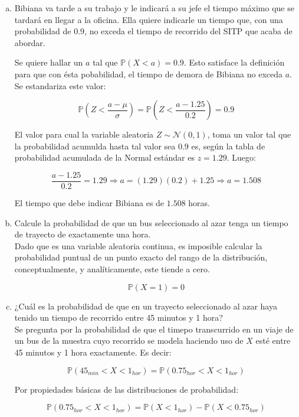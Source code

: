 \documentclass[11pt, spanish]{article}
\begin{document}
\begin{enumerate}[(a)]
\item Bibiana va tarde a su trabajo y le indicará a su jefe el tiempo máximo que se
tardará en llegar a la oficina. Ella quiere indicarle un tiempo que, con una probabilidad de 0.9,
no exceda el tiempo de recorrido del SITP que acaba de abordar.

Se quiere hallar un $a$ tal que $\mathbb{P}(X < a) = 0.9$. Esto satisface la definición para que con ésta pobabilidad, el tiempo de demora de Bibiana no exceda $a$. Se estandariza este valor:

$$\mathbb{P}\left(Z < \frac{a - \mu}{\sigma} \right) = \mathbb{P}\left(Z < \frac{a - 1.25}{0.2} \right)  = 0.9$$

El valor para cual la variable aleatoria $Z \sim \mathcal{N} (0, 1)$, toma un valor tal que la probabilidad acumulda hasta tal valor sea $0.9$ es, según la tabla de probabilidad acumulada de la Normal estándar es $z = 1.29$. Luego:

$$\frac{a - 1.25}{0.2} = 1.29 \Rightarrow a = (1.29)(0.2) + 1.25 \Rightarrow a = 1.508$$

El tiempo que debe indicar Bibiana es de $1.508$ horas.

\pagebreak
\item Calcule la probabilidad de que un bus seleccionado al azar tenga un tiempo de
trayecto de exactamente una hora.\\

Dado que es una variable aleatoria continua, es imposible calcular la probabilidad puntual de un punto exacto del rango de la distribución, conceptualmente, y analíticamente, este tiende a cero.

$$\mathbb{P}\left(X = 1\right) = 0$$

\item ¿Cuál es la probabilidad de que en un trayecto seleccionado al azar haya tenido
un tiempo de recorrido entre 45 minutos y 1 hora?\\

Se pregunta por la probabilidad de que el timepo transcurrido en un viaje de un bus de la muestra cuyo recorrido se modela haciendo uso de $X$ esté entre 45 minutos y 1 hora exactamente. Es decir:

$$\mathbb{P}(45_{min} < X < 1_{hor}) = \mathbb{P}(0.75_{hor} < X < 1_{hor})$$
 
Por propiedades básicas de las distribuciones de probabilidad:
 
$$\mathbb{P}(0.75_{hor} < X < 1_{hor}) = \mathbb{P}(X < 1_{hor}) - \mathbb{P}(X < 0.75_{hor})$$


\end{enumerate}
\end{document}
